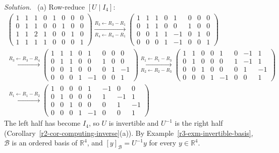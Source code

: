 \documentclass[12pt]{article}
\newcommand{\R}{\mathbb R}
\theoremstyle{definition}
\newenvironment{solution}{\par\noindent\textit{Solution.}\ }{\par\smallskip}
\begin{document}
\begin{solution}
(a) Row-reduce \([U\mid I_4]\):
\[
\begin{gathered}
\left(\begin{array}{cccc|cccc}1&1&1&0&1&0&0&0\\0&1&1&0&0&1&0&0\\1&1&2&1&0&0&1&0\\1&1&1&1&0&0&0&1\end{array}\right)
\xrightarrow[R_4\leftarrow R_4-R_1]{R_3\leftarrow R_3-R_1}
\left(\begin{array}{cccc|cccc}1&1&1&0&1&0&0&0\\0&1&1&0&0&1&0&0\\0&0&1&1&-1&0&1&0\\0&0&0&1&-1&0&0&1\end{array}\right)
\\
\xrightarrow{R_3\leftarrow R_3-R_4}
\left(\begin{array}{cccc|cccc}1&1&1&0&1&0&0&0\\0&1&1&0&0&1&0&0\\0&0&1&0&0&0&1&-1\\0&0&0&1&-1&0&0&1\end{array}\right)
\xrightarrow[R_2\leftarrow R_2-R_3]{R_1\leftarrow R_1-R_3}
\left(\begin{array}{cccc|cccc}1&1&0&0&1&0&-1&1\\0&1&0&0&0&1&-1&1\\0&0&1&0&0&0&1&-1\\0&0&0&1&-1&0&0&1\end{array}\right)
\\
\xrightarrow{R_1\leftarrow R_1-R_2}
\left(\begin{array}{cccc|cccc}1&0&0&0&1&-1&0&0\\0&1&0&0&0&1&-1&1\\0&0&1&0&0&0&1&-1\\0&0&0&1&-1&0&0&1\end{array}\right)
\end{gathered}
\]
The left half has become \(I_4\), so \(U\) is invertible and \(U^{-1}\) is the right half
(Corollary~\ref{r2-cor-computing-inverse}(a)). By Example~\ref{r3-exm-invertible-basis}, \(\mathcal B\) is an
ordered basis of \(\R^4\), and \([y]_{\mathcal B}=U^{-1}y\) for every \(y\in\R^4\).


\end{solution}
\end{document}

